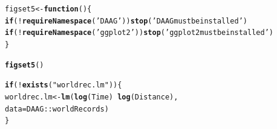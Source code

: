 \documentclass[12pt, a4paper,  BCOR=8.25mm, DIV=15]{scrartcl}\usepackage[]{graphicx}\usepackage[]{color}
\makeatletter
\newcommand{\hlstr}[1]{\textcolor[rgb]{0.192,0.494,0.8}{#1}}%
\newcommand{\hlopt}[1]{\textcolor[rgb]{0,0,0}{#1}}%
\newcommand{\hlstd}[1]{\textcolor[rgb]{0.345,0.345,0.345}{#1}}%
\newcommand{\hlkwa}[1]{\textcolor[rgb]{0.161,0.373,0.58}{\textbf{#1}}}%
\newcommand{\hlkwb}[1]{\textcolor[rgb]{0.69,0.353,0.396}{#1}}%
\newcommand{\hlkwc}[1]{\textcolor[rgb]{0.333,0.667,0.333}{#1}}%
\newcommand{\hlkwd}[1]{\textcolor[rgb]{0.737,0.353,0.396}{\textbf{#1}}}%
\newenvironment{kframe}{%
 \def\at@end@of@kframe{}%
 \ifinner\ifhmode%
  \def\at@end@of@kframe{\end{minipage}}%
  \begin{minipage}{\columnwidth}%
 \fi\fi%
 \def\FrameCommand##1{\hskip\@totalleftmargin \hskip-\fboxsep
 \colorbox{shadecolor}{##1}\hskip-\fboxsep
     \hskip-\linewidth \hskip-\@totalleftmargin \hskip\columnwidth}%
 \MakeFramed {\advance\hsize-\width
   \@totalleftmargin\z@ \linewidth\hsize
   \@setminipage}}%
 {\par\unskip\endMakeFramed%
 \at@end@of@kframe}
\newenvironment{knitrout}{}{} %
\makeatother
\begin{document}
\begin{knitrout}
\color{fgcolor}\begin{kframe}
\begin{alltt}
\hlstd{figset5} \hlkwb{<-} \hlkwa{function}\hlstd{()\{}
    \hlkwa{if}\hlstd{(}\hlopt{!}\hlkwd{requireNamespace}\hlstd{(}\hlstr{'DAAG'}\hlstd{))}\hlkwd{stop}\hlstd{(}\hlstr{'DAAG must be installed'}\hlstd{)}
  \hlkwa{if}\hlstd{(}\hlopt{!}\hlkwd{requireNamespace}\hlstd{(}\hlstr{'ggplot2'}\hlstd{))}\hlkwd{stop}\hlstd{(}\hlstr{'ggplot2 must be installed'}\hlstd{)}
  \hlstd{\}}
\end{alltt}
\end{kframe}
\end{knitrout}

\begin{knitrout}
\color{fgcolor}\begin{kframe}
\begin{alltt}
\hlkwd{figset5}\hlstd{()}
\end{alltt}


{\ttfamily\noindent\itshape\color{messagecolor}{Loading required namespace: DAAG\\Loading required namespace: ggplot2}}\begin{alltt}
\hlkwa{if}\hlstd{(}\hlopt{!}\hlkwd{exists}\hlstd{(}\hlstr{"worldrec.lm"}\hlstd{))\{}
    \hlstd{worldrec.lm} \hlkwb{<-} \hlkwd{lm}\hlstd{(}\hlkwd{log}\hlstd{(Time)} \hlopt{~} \hlkwd{log}\hlstd{(Distance),}
                      \hlkwc{data}\hlstd{=DAAG}\hlopt{::}\hlstd{worldRecords)}
\hlstd{\}}
\end{alltt}
\end{kframe}
\end{knitrout}
\end{document}
